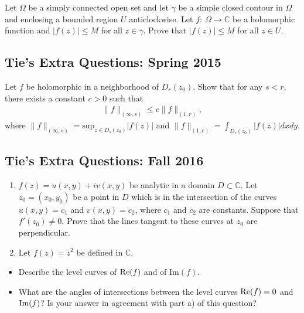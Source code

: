 Let \(\Omega\) be a simply connected open set and let \(\gamma\) be a
simple closed contour in \(\Omega\) and enclosing a bounded region \(U\)
anticlockwise. Let \(f: \ \Omega \to {\mathbb C}\) be a holomorphic
function and \(|f(z)|\leq M\) for all \(z\in \gamma\). Prove that
\(|f(z)|\leq M\) for all \(z\in U\).

\hypertarget{ties-extra-questions-spring-2015-19}{%
\subsection{Tie's Extra Questions: Spring
2015}\label{ties-extra-questions-spring-2015-19}}

Let \(f\) be holomorphic in a neighborhood of \(D_r(z_0)\). Show that
for any \(s<r\), there exists a constant \(c>0\) such that
\begin{align*}\|f\|_{(\infty, s)} \leq c \|f\|_{(1, r)},\end{align*}
where
\(\displaystyle \|f\|_{(\infty, s)} = \text{sup}_{z \in D_s(z_0)}|f(z)|\)
and \(\displaystyle \|f\|_{(1, r)} = \int_{D_r(z_0)} |f(z)|dx dy\).

\hypertarget{ties-extra-questions-fall-2016-2}{%
\subsection{Tie's Extra Questions: Fall
2016}\label{ties-extra-questions-fall-2016-2}}

\begin{enumerate}
\def\labelenumi{\alph{enumi}.}
\item
  \(f(z)= u(x,y) +i v(x,y)\) be analytic in a domain
  \(D\subset {\mathbb C}\). Let \(z_0=(x_0,y_0)\) be a point in \(D\)
  which is in the intersection of the curves \(u(x,y)= c_1\) and
  \(v(x,y)=c_2\), where \(c_1\) and \(c_2\) are constants. Suppose that
  \(f'(z_0)\neq 0\). Prove that the lines tangent to these curves at
  \(z_0\) are perpendicular.
\item
  Let \(f(z)=z^2\) be defined in \({\mathbb{C}}\).
\end{enumerate}

\begin{itemize}
\item
  Describe the level curves of \(\mbox{\textrm Re}{(f)}\) and of
  \(\mbox{Im}{(f)}\).
\item
  What are the angles of intersections between the level curves
  \(\mbox{\textrm Re}{(f)}=0\) and \(\mbox{\textrm Im}{(f)}\)? Is your
  answer in agreement with part a) of this question?
\end{itemize}

